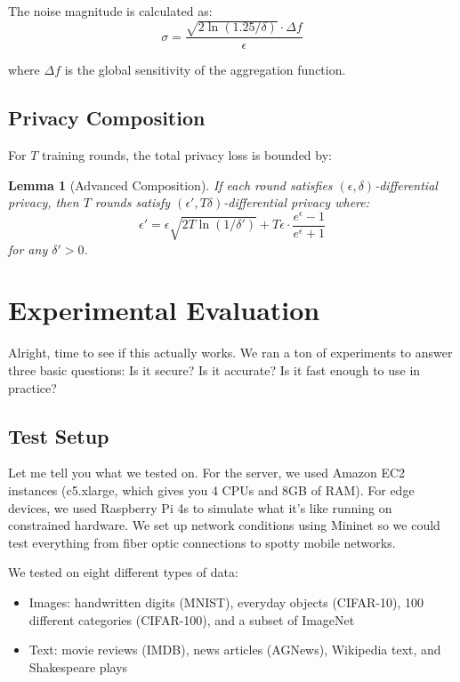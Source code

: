 \documentclass[journal,onecolumn]{IEEEtran}
\newtheorem{lemma}[theorem]{Lemma}
\begin{document}
The noise magnitude is calculated as:
$$\sigma = \frac{\sqrt{2\ln(1.25/\delta)} \cdot \Delta f}{\epsilon}$$

where $\Delta f$ is the global sensitivity of the aggregation function.

\subsection{Privacy Composition}

For $T$ training rounds, the total privacy loss is bounded by:

\begin{lemma}[Advanced Composition]
If each round satisfies $(\epsilon, \delta)$-differential privacy, then $T$ rounds satisfy $(\epsilon', T\delta)$-differential privacy where:
$$\epsilon' = \epsilon\sqrt{2T\ln(1/\delta')} + T\epsilon \cdot \frac{e^\epsilon - 1}{e^\epsilon + 1}$$
for any $\delta' > 0$.
\end{lemma}

\section{Experimental Evaluation}
\label{sec:evaluation}

Alright, time to see if this actually works. We ran a ton of experiments to answer three basic questions: Is it secure? Is it accurate? Is it fast enough to use in practice?

\subsection{Test Setup}

Let me tell you what we tested on. For the server, we used Amazon EC2 instances (c5.xlarge, which gives you 4 CPUs and 8GB of RAM). For edge devices, we used Raspberry Pi 4s to simulate what it's like running on constrained hardware. We set up network conditions using Mininet so we could test everything from fiber optic connections to spotty mobile networks.

We tested on eight different types of data:
\begin{itemize}
\item Images: handwritten digits (MNIST), everyday objects (CIFAR-10), 100 different categories (CIFAR-100), and a subset of ImageNet
\item Text: movie reviews (IMDB), news articles (AGNews), Wikipedia text, and Shakespeare plays
\end{itemize}
\end{document}

